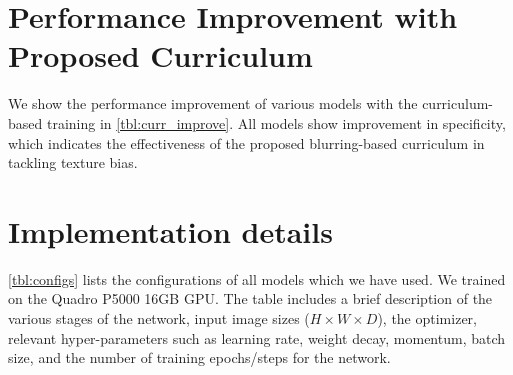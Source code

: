 \documentclass[10pt,twocolumn,letterpaper]{article}
\begin{document}
\begin{table}[t]
	\centering
{}
	\caption{Model performances (10-fold cross-validation) for training with our proposed visual acuity-based curriculum.}
\label{tbl:curr_improve}
\end{table}

\section{Performance Improvement with Proposed Curriculum}
\label{supp:curr_improve}
We show the performance improvement of various models with the curriculum-based training in \cref{tbl:curr_improve}. All models show improvement in specificity, which indicates the effectiveness of the proposed blurring-based curriculum in tackling texture bias. 

\section{Implementation details}
\label{supp:impl}
\cref{tbl:configs} lists the configurations of all models which we have used. We trained on the Quadro P5000 16GB GPU. The table includes a brief description of the various stages of the network, input image sizes ($H\times W\times D$), the optimizer, relevant hyper-parameters such as learning rate, weight decay, momentum, batch size, and the number of training epochs/steps for the network. 
\end{document}
